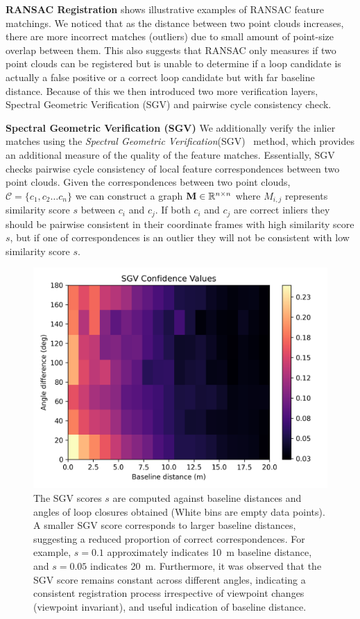 \noindent \textbf{RANSAC Registration}\hspace{0.5em}  shows illustrative examples of RANSAC feature matchings. We noticed that as the distance between two point clouds increases, there are more incorrect matches (outliers) due to small amount of point-size overlap between them. This also suggests that RANSAC only measures if two point clouds can be registered but is unable to determine if a loop candidate is actually a false positive or a correct loop candidate but with far baseline distance. Because of this we then introduced two more verification layers, Spectral Geometric Verification (SGV) and pairwise cycle consistency check. 

\noindent \textbf{Spectral Geometric Verification (SGV)}\hspace{0.5em} We additionally verify the inlier matches using the \emph{Spectral Geometric Verification}(SGV)~\cite{vidanapathirana2023ral} method, which provides an additional measure of the quality of the feature matches. Essentially, SGV checks pairwise cycle consistency of local feature correspondences between two point clouds. Given the correspondences between two point clouds, $\mathcal{C}=\{c_1, c_2 \ldots c_n\}$ we can construct a graph $\mathbf{M} \in \mathbb{R}^{n \times n}$ where $M_{i,j}$ represents similarity score $s$ between $c_i$ and $c_j$. If both $c_i$ and $c_j$ are correct inliers they should be pairwise consistent in their coordinate frames with high similarity score $s$, but if one of correspondences is an outlier they will not be consistent with low similarity score $s$. 
\begin{figure}[t]
  \centering
  \includegraphics*[width=0.8\columnwidth]{pics/methods_svg_distance2.png}
  \caption{The SGV scores $s$ are computed against baseline distances and angles of loop closures obtained (White bins are empty data points). A smaller SGV score corresponds to larger baseline distances, suggesting a reduced proportion of correct correspondences. 
  For example, $s=0.1$ approximately indicates \SI{10}{\meter} baseline distance, and $s=0.05$ indicates \SI{20}{\meter}. Furthermore, it was observed that the SGV score remains constant across different angles, indicating a consistent registration process irrespective of viewpoint changes (viewpoint invariant), and useful indication of baseline distance.}
  \label{fig:sgv_distance}
\end{figure}
